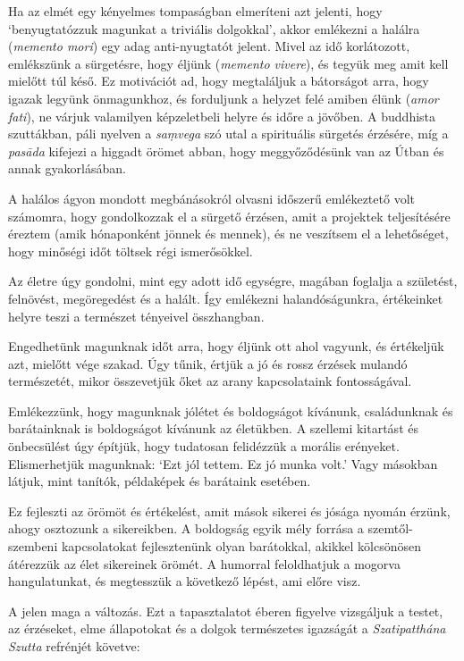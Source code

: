 
Ha az elmét egy kényelmes tompaságban elmeríteni azt jelenti, hogy
`benyugtatózzuk magunkat a triviális dolgokkal', akkor emlékezni a
halálra (\emph{memento mori}) egy adag anti-nyugtatót jelent. Mivel az
idő korlátozott, emlékszünk a sürgetésre, hogy éljünk (\emph{memento
vivere}), és tegyük meg amit kell mielőtt túl késő. Ez motivációt ad,
hogy megtaláljuk a bátorságot arra, hogy igazak legyünk önmagunkhoz, és
forduljunk a helyzet felé amiben élünk (\emph{amor fati}), ne várjuk
valamilyen képzeletbeli helyre és időre a jövőben. A buddhista
szuttákban, páli nyelven a \emph{saṃvega} szó utal a spirituális
sürgetés érzésére, míg a \emph{pasāda} kifejezi a higgadt örömet abban,
hogy meggyőződésünk van az Útban és annak gyakorlásában.

A halálos ágyon mondott megbánásokról olvasni időszerű emlékeztető volt
számomra, hogy gondolkozzak el a sürgető érzésen, amit a projektek
teljesítésére éreztem (amik hónaponként jönnek és mennek), és ne
veszítsem el a lehetőséget, hogy minőségi időt töltsek régi
ismerősökkel.

Az életre úgy gondolni, mint egy adott idő egységre, magában foglalja a
születést, felnövést, megöregedést és a halált. Így emlékezni
halandóságunkra, értékeinket helyre teszi a természet tényeivel
összhangban.

Engedhetünk magunknak időt arra, hogy éljünk ott ahol vagyunk, és
értékeljük azt, mielőtt vége szakad. Úgy tűnik, értjük a jó és rossz
érzések mulandó természetét, mikor összevetjük őket az arany
kapcsolataink fontosságával.

Emlékezzünk, hogy magunknak jólétet és boldogságot kívánunk,
családunknak és barátainknak is boldogságot kívánunk az életükben. A
szellemi kitartást és önbecsülést úgy építjük, hogy tudatosan felidézzük
a morális erényeket. Elismerhetjük magunknak: `Ezt jól tettem. Ez jó
munka volt.' Vagy másokban látjuk, mint tanítók, példaképek és barátaink
esetében.

Ez fejleszti az örömöt és értékelést, amit mások sikerei és jósága
nyomán érzünk, ahogy osztozunk a sikereikben. A boldogság egyik mély
forrása a szemtől-szembeni kapcsolatokat fejlesztenünk olyan barátokkal,
akikkel kölcsönösen átérezzük az élet sikereinek örömét. A humorral
feloldhatjuk a mogorva hangulatunkat, és megtesszük a következő lépést,
ami előre visz.

A jelen maga a változás. Ezt a tapasztalatot éberen figyelve vizsgáljuk
a testet, az érzéseket, elme állapotokat és a dolgok természetes
igazságát a \emph{Szatipatthána Szutta} refrénjét követve:

